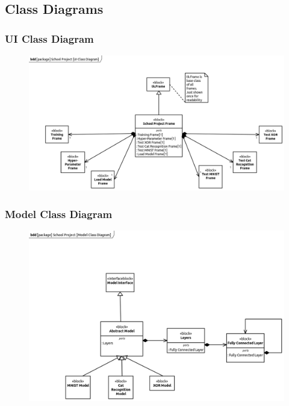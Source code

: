 \documentclass[./project-report/src/latex/project-report.tex]{subfiles}
\begin{document}
\pagebreak

\subsection{Class Diagrams}

\subsubsection{UI Class Diagram}

\begin{figure}[h!]
\centering
\includegraphics[width=1\textwidth]{./project-report/src/images/ui-class-diagram.png}
\end{figure}

\subsubsection{Model Class Diagram}

\begin{figure}[h!]
\centering
\includegraphics[width=1\textwidth]{./project-report/src/images/model-class-diagram.png}
\end{figure}
\end{document}
